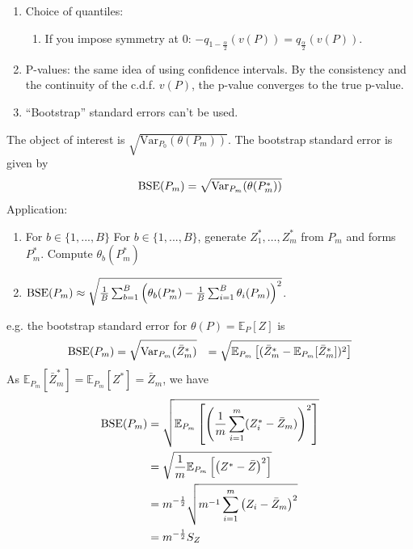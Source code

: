 \documentclass[11pt]{elegantbook}
\begin{document}
\begin{remark}
    \begin{enumerate}[(1).]
        \item Choice of quantiles:
        \begin{enumerate}
            \item If you impose symmetry at $0$: $-q_{1-\frac{\alpha}{2}}(v(P))=q_{\frac{\alpha}{2}}(v(P))$.
        \end{enumerate}
        \item P-values: the same idea of using confidence intervals. By the consistency and the continuity of the c.d.f. $v(P)$, the p-value converges to the true p-value.
        \item ``Bootstrap'' standard errors can't be used.
    \end{enumerate}
\begin{definition}
    \normalfont
    The object of interest is $\sqrt{\text{Var}_{P_0}(\theta(P_m))}$. The bootstrap standard error is given by $$\textnormal{BSE}(P_m)=\sqrt{\text{Var}_{P_m}(\theta(P_m^*))}$$
    Application:
    \begin{enumerate}
        \item For $b\in\{1,...,B\}$
        \subitem For $b\in\{1,...,B\}$, generate $Z_1^*,\ldots,Z_m^*$ from $P_m$ and forms $P_m^*$.
        \subitem Compute $\theta_b(P_m^*)$
        \item $\textnormal{BSE}(P_m)\approx \sqrt{\frac{1}{B}\sum_{b=1}^B\left(\theta_b(P_m^*)-\frac{1}{B}\sum_{i=1}^B\theta_i(P_m)\right)^2}$.
    \end{enumerate}
\end{definition}
e.g. the bootstrap standard error for $\theta(P)=\mathbb{E}_P[Z]$ is
\begin{equation}
    \begin{aligned}
        \textnormal{BSE}(P_m)&=\sqrt{\text{Var}_{P_m}(\bar{Z}^*_m)}
        &=\sqrt{\mathbb{E}_{P_m}\left[(\bar{Z}^*_m-\mathbb{E}_{P_m}[\bar{Z}^*_m])^2\right]}
    \end{aligned}
    \nonumber
\end{equation}
As $\mathbb{E}_{P_m}[\bar{Z}^*_m]=\mathbb{E}_{P_m}[Z^*]=\bar{Z}_m$, we have
\begin{equation}
    \begin{aligned}
        \textnormal{BSE}(P_m)&=\sqrt{\mathbb{E}_{P_m}\left[\left(\frac{1}{m}\sum_{i=1}^m(Z^*_i-\bar{Z}_m)\right)^2\right]}\\
        &=\sqrt{\frac{1}{m}\mathbb{E}_{P_m}\left[\left(Z^*-\bar{Z}\right)^2\right]}\\
        &=m^{-\frac{1}{2}}\sqrt{m^{-1}\sum_{i=1}^m\left(Z_i-\bar{Z}_m\right)^2}\\
        &=m^{-\frac{1}{2}}S_Z
    \end{aligned}
    \nonumber
\end{equation}
\end{remark}
\end{document}
